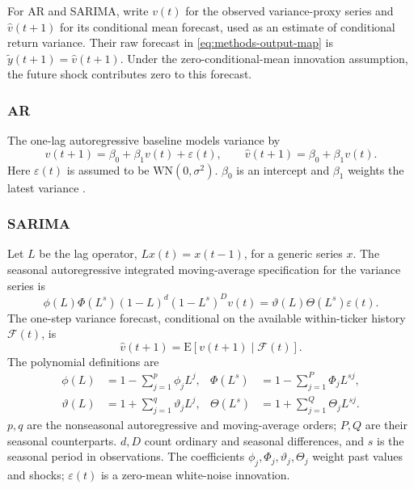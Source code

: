 \documentclass[12pt,a4paper]{article}
\numberwithin{equation}{section}
\numberwithin{table}{section}
\numberwithin{figure}{section}
\begin{document}
For AR and SARIMA, write $v(t)$ for the observed variance-proxy series and $\widehat v(t+1)$ for its conditional mean forecast, used as an estimate of conditional return variance. Their raw forecast in \eqref{eq:methods-output-map} is $\widetilde y(t+1)=\widehat v(t+1)$. Under the zero-conditional-mean innovation assumption, the future shock contributes zero to this forecast.

\subsubsection{AR}
The one-lag autoregressive baseline models variance by
\begin{equation}\label{eq:methods-ar}
v(t+1)=\beta_0+\beta_1v(t)+\varepsilon(t),\qquad
\widehat v(t+1)=\beta_0+\beta_1v(t).
\end{equation}
\noindent Here $\varepsilon(t)$ is assumed to be $\mathrm{WN}(0,\sigma^2)$. $\beta_0$ is an intercept and $\beta_1$ weights the latest variance \cite{yule1927}.

\subsubsection{SARIMA}
Let $L$ be the lag operator, $Lx(t)=x(t-1)$, for a generic series $x$. The seasonal autoregressive integrated moving-average specification for the variance series is
\begin{equation}\label{eq:methods-sarima}
\phi(L)\Phi(L^s)(1-L)^d(1-L^s)^D v(t)
=\vartheta(L)\Theta(L^s)\varepsilon(t).
\end{equation}
The one-step variance forecast, conditional on the available within-ticker history $\mathcal F(t)$, is
\begin{equation}\label{eq:methods-sarima-forecast}
\widehat v(t+1)=\mathrm E\!\left[v(t+1)\mid\mathcal F(t)\right].
\end{equation}
The polynomial definitions are
\begin{equation}\label{eq:methods-sarima-polynomials}
\begin{aligned}
\phi(L)&=1-\sum_{j=1}^{p}\phi_j L^j,&
\Phi(L^s)&=1-\sum_{j=1}^{P}\Phi_j L^{sj},\\
\vartheta(L)&=1+\sum_{j=1}^{q}\vartheta_j L^j,&
\Theta(L^s)&=1+\sum_{j=1}^{Q}\Theta_j L^{sj}.
\end{aligned}
\end{equation}
$p,q$ are the nonseasonal autoregressive and moving-average orders; $P,Q$ are their seasonal counterparts. $d,D$ count ordinary and seasonal differences, and $s$ is the seasonal period in observations. The coefficients $\phi_j,\Phi_j,\vartheta_j,\Theta_j$ weight past values and shocks; $\varepsilon(t)$ is a zero-mean white-noise innovation. 
\end{document}
